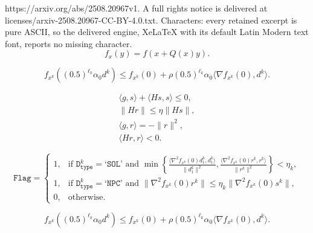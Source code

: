 \documentclass[10pt,a4paper]{amsart}
\begin{document}
https://arxiv.org/abs/2508.20967v1. A full rights notice is delivered at licenses/arxiv-2508.20967-CC-BY-4.0.txt. Characters: every retained excerpt is pure ASCII, so the delivered engine, XeLaTeX with its default Latin Modern text font, reports no missing character.
\begin{equation}
f_{x}(y)=f(x+Q(x)y).
\label{eq:fx}
\end{equation}

\begin{equation} \label{eq:2.3}
f_{x^k}((0.5)^{\ell_{k}} \alpha_0 d^k) \leq f_{x^{k}}(0)+\rho (0.5)^{\ell_{k}} \alpha_0 \langle\nabla f_{x^{k}}(0),d^{k}\rangle.
\end{equation}

\begin{eqnarray} 
&\langle g,s\rangle+\langle Hs,s\rangle\leq 0,& \label{eq:minres1} \\
&\|Hr\|\leq\eta\|Hs\|,& \label{eq:minres3} \\
&\langle g,r\rangle=-\|r\|^{2},& \label{eq:minres4} \\
&\langle Hr,r\rangle<0.& \label{eq:minres5}
\end{eqnarray}

\begin{equation} \label{eq:flag}
\texttt{Flag}=
\left\{
\begin{array}{ll} 
1, & \text{if } \texttt{D}_{\texttt{type}}^{k}=\texttt{`SOL'} 
\text{ and } \min\left\{\frac{\langle\nabla^{2}f_{x^{k}}(0)d_{1}^{k},d_{1}^{k}\rangle}{\|d_{1}^{k}\|^{2}},\frac{\langle\nabla^{2}f_{x^{k}}(0)r^{k},r^{k}\rangle}{\|r^{k}\|^{2}}\right\}<\eta_k,\\
1, & \text{if } \texttt{D}_{\texttt{type}}^{k}=\texttt{`NPC'} 
\text{ and } \|\nabla^{2}f_{x^{k}}(0)r^{k}\|\leq\eta_k\|\nabla^{2}f_{x^{k}}(0)s^{k}\|,\\
0, & \text{otherwise}.
\end{array}
\right.
\end{equation}

\begin{equation} \label{eq:2.21}
f_{x^k}((0.5)^{\ell_{k}} \alpha_0 d^k) \leq f_{x^{k}}(0)+\rho (0.5)^{\ell_{k}} \alpha_0 \langle\nabla f_{x^{k}}(0),d^{k}\rangle.
\end{equation}
\end{document}
